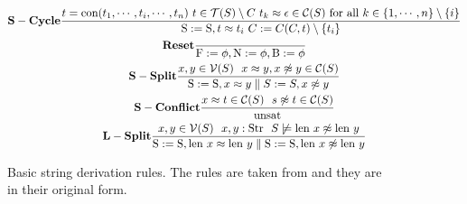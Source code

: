 \begin{figure}
\begin{minipage}{1.0\textwidth}
\scriptsize
\begin{gather*}\label{eA1}
 \bold{S-Cycle} \frac
 { t = \textnormal{con}(t_1, \cdots, t_i, \cdots, t_n) \ t \in \mathcal{T}(S) \setminus C \ t_k \approx \epsilon \in \mathcal{C}(S) \ \textnormal{for all} \ k \in \{1,\cdots,n\} \setminus \{ i \} }
 { \textnormal{S} := \textnormal{S}, t \approx t_i \ C:=C (C, t) \setminus \{t_i\}   }\\
  \bold{Reset} \frac{ }
  { \textnormal{F} := \phi, \textnormal{N} := \phi, \textnormal{B} := \phi}\\
   \bold{S-Split} \frac
   { x, y \in \mathcal{V}(S) \ \ x \approx y, x \not\approx y \in \mathcal{C}(S) }
   { \textnormal{S} := \textnormal{S}, x \approx y \parallel S:= S, x \not\approx y}\\
      \bold{S-Conflict} \frac
      { x \approx t \in \mathcal{C}(S) \ \ s \not\approx t \in \mathcal{C}(S)}
      { \textnormal{unsat}}\\
      \bold{L-Split} \frac
       { x, y \in \mathcal{V}(S) \ \ x,y: \textnormal{Str}  \ \  S \not\models \textnormal{len} \ x \not\approx \textnormal{len} \ y}
       { \textnormal{S}:= \textnormal{S}, \textnormal{len} \ x \approx \textnormal{len} \ y \parallel \textnormal{S}:=\textnormal{S}, \textnormal{len} \ x \not\approx \textnormal{len} \ y}
\end{gather*}
\null
\par\xdef\tpd{\the\prevdepth}
\end{minipage}
\caption{Basic string derivation rules. The rules are taken from \cite{main-paper} and they are in their original form.}
\label{rules_2}
\end{figure}
